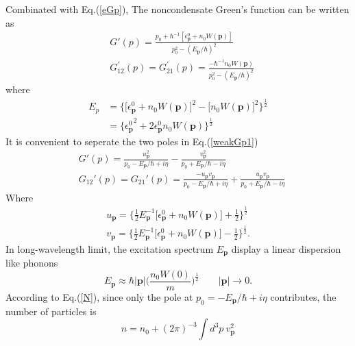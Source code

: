 \documentclass[12pt]{article}
\begin{document}
Combinated with Eq.(\ref{eGp}), The noncondensate Green's function can be written 
as 
\begin{equation}\label{weakGp1}
    \begin{aligned}
        &G'(p)=\frac{p_{0}+\hbar^{-1}\left[\epsilon_{\mathbf{p}}^{0}+n_0
        W(\mathbf{p})\right]}{p_{0}^{2}-\left(E_{\mathbf{p}}/\hbar\right)^{2}}\\
        &G_{12}^{\prime}(p)=G_{21}^{\prime}(p)=\frac{-\hbar^{-1}n_0W(\mathbf{p})}
        {p_{0}^{2}-\left(E_{\mathbf{p}} / \hbar\right)^2}
    \end{aligned}
\end{equation} 
where
\begin{equation}
    \begin{aligned}
        E_{p} &=\big\{\big[\epsilon_{\mathbf{p}}^{0}+n_{0} W(\mathbf{p})\big]^{2}
        -\big[n_{0} W(\mathbf{p})\big]^{2}\big\}^{\frac{1}{2}} \\
        &=\big\{{\epsilon_{\mathbf{p}}^0}^2+2\epsilon_{\mathbf{p}}^0n_0
        W(\mathbf{p})\big\}^{\frac{1}{2}}
        \end{aligned}
\end{equation} 
It is convenient to seperate the two poles in Eq.(\ref{weakGp1})
\begin{subequations}
    \begin{align}
        &G'(p)=\frac{u_{\mathbf{p}}^2}{p_0-E_{\mathbf{p}}/\hbar+i\eta}-
        \frac{v_{\mathbf{p}}^{2}}{p_{0}+E_{\mathbf{p}} /\hbar-i\eta}\label{Za}\\
        &G_{12}'(p)=G_{21}'(p)=\frac{-u_{\mathbf{p}}v_{\mathbf{p}}}{p_{0}-
        E_{\mathbf{p}}/\hbar+i \eta}+\frac{u_{\mathbf{p}}v_{\mathbf{p}}}{p_0+
        E_{\mathbf{p}}/\hbar-i\eta}\label{Zb}
        \end{align}
\end{subequations}
Where
\begin{equation}
    \begin{aligned}
        u_{\mathbf{p}}=\Big\{\frac{1}{2} E_{\mathbf{p}}^{-1}\big[\epsilon_{\mathbf{p}}^{0}
        +n_0W(\mathbf{p})\big]+\frac{1}{2}\Big\}^{\frac{1}{2}}\\
        v_{\mathbf{p}}=\Big\{\frac{1}{2}E_{\mathbf{p}}^{-1}\big[\epsilon_{\mathbf{p}}
        ^{0}+n_{0}W(\mathbf{p})\big]-\frac{1}{2}\Big\}^{\frac{1}{2}}.
    \end{aligned}  
\end{equation}
In long-wavelength limit, the excitation spectrum $E_\mathbf{p}$ display a linear 
dispersion like phonons
\begin{equation}
    E_{\mathbf{p}}\approx \hbar|\mathbf{p}|\Big(\frac{n_0W(0)}{m}\Big)^{\frac{1}{2}}
    \qquad |\mathbf{p}|\rightarrow 0.
\end{equation}
According to Eq.(\ref{N}), since only the pole at $p_0=-E_\mathbf{p}/\hbar+i\eta$ contributes, 
the number of particles is 
\begin{equation}\label{N1}
    n=n_{0}+(2 \pi)^{-3} \int d^{3} p\ v_{\mathbf{p}}^{2}
\end{equation}
\end{document}
